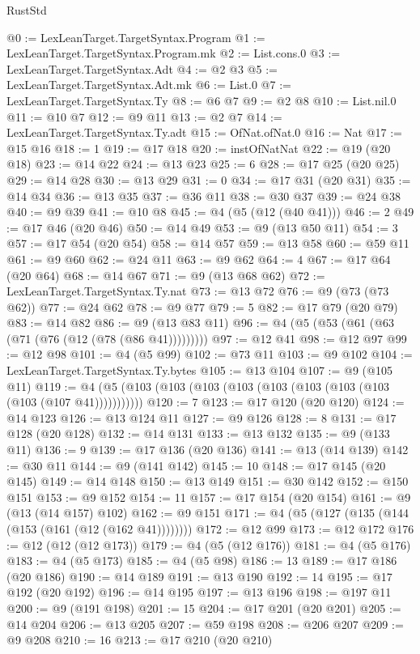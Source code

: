 \begin{lexlean}{RustStd}
\begin{coremodule}
{\begin{coremodule}
{{{{{{{{{{{{{{{{{{{{{{{{{@0 := LexLeanTarget.TargetSyntax.Program
@1 := LexLeanTarget.TargetSyntax.Program.mk
@2 := List.cons.{0}
@3 := LexLeanTarget.TargetSyntax.Adt
@4 := @2 @3
@5 := LexLeanTarget.TargetSyntax.Adt.mk
@6 := List.{0}
@7 := LexLeanTarget.TargetSyntax.Ty
@8 := @6 @7
@9 := @2 @8
@10 := List.nil.{0}
@11 := @10 @7
@12 := @9 @11
@13 := @2 @7
@14 := LexLeanTarget.TargetSyntax.Ty.adt
@15 := OfNat.ofNat.{0}
@16 := Nat
@17 := @15 @16
@18 := 1
@19 := @17 @18
@20 := instOfNatNat
@22 := @19 (@20 @18)
@23 := @14 @22
@24 := @13 @23
@25 := 6
@28 := @17 @25 (@20 @25)
@29 := @14 @28
@30 := @13 @29
@31 := 0
@34 := @17 @31 (@20 @31)
@35 := @14 @34
@36 := @13 @35
@37 := @36 @11
@38 := @30 @37
@39 := @24 @38
@40 := @9 @39
@41 := @10 @8
@45 := @4 (@5 (@12 (@40 @41)))
@46 := 2
@49 := @17 @46 (@20 @46)
@50 := @14 @49
@53 := @9 (@13 @50 @11)
@54 := 3
@57 := @17 @54 (@20 @54)
@58 := @14 @57
@59 := @13 @58
@60 := @59 @11
@61 := @9 @60
@62 := @24 @11
@63 := @9 @62
@64 := 4
@67 := @17 @64 (@20 @64)
@68 := @14 @67
@71 := @9 (@13 @68 @62)
@72 := LexLeanTarget.TargetSyntax.Ty.nat
@73 := @13 @72
@76 := @9 (@73 (@73 @62))
@77 := @24 @62
@78 := @9 @77
@79 := 5
@82 := @17 @79 (@20 @79)
@83 := @14 @82
@86 := @9 (@13 @83 @11)
@96 := @4 (@5 (@53 (@61 (@63 (@71 (@76 (@12 (@78 (@86 @41)))))))))
@97 := @12 @41
@98 := @12 @97
@99 := @12 @98
@101 := @4 (@5 @99)
@102 := @73 @11
@103 := @9 @102
@104 := LexLeanTarget.TargetSyntax.Ty.bytes
@105 := @13 @104
@107 := @9 (@105 @11)
@119 := @4 (@5 (@103 (@103 (@103 (@103 (@103 (@103 (@103 (@103 (@103 (@107 @41)))))))))))
@120 := 7
@123 := @17 @120 (@20 @120)
@124 := @14 @123
@126 := @13 @124 @11
@127 := @9 @126
@128 := 8
@131 := @17 @128 (@20 @128)
@132 := @14 @131
@133 := @13 @132
@135 := @9 (@133 @11)
@136 := 9
@139 := @17 @136 (@20 @136)
@141 := @13 (@14 @139)
@142 := @30 @11
@144 := @9 (@141 @142)
@145 := 10
@148 := @17 @145 (@20 @145)
@149 := @14 @148
@150 := @13 @149
@151 := @30 @142
@152 := @150 @151
@153 := @9 @152
@154 := 11
@157 := @17 @154 (@20 @154)
@161 := @9 (@13 (@14 @157) @102)
@162 := @9 @151
@171 := @4 (@5 (@127 (@135 (@144 (@153 (@161 (@12 (@162 @41))))))))
@172 := @12 @99
@173 := @12 @172
@176 := @12 (@12 (@12 @173))
@179 := @4 (@5 (@12 @176))
@181 := @4 (@5 @176)
@183 := @4 (@5 @173)
@185 := @4 (@5 @98)
@186 := 13
@189 := @17 @186 (@20 @186)
@190 := @14 @189
@191 := @13 @190
@192 := 14
@195 := @17 @192 (@20 @192)
@196 := @14 @195
@197 := @13 @196
@198 := @197 @11
@200 := @9 (@191 @198)
@201 := 15
@204 := @17 @201 (@20 @201)
@205 := @14 @204
@206 := @13 @205
@207 := @59 @198
@208 := @206 @207
@209 := @9 @208
@210 := 16
@213 := @17 @210 (@20 @210)
}}}}}}}}}}}}}}}}}}}}}}}}}
\end{coremodule}}
\end{coremodule}
\end{lexlean}
